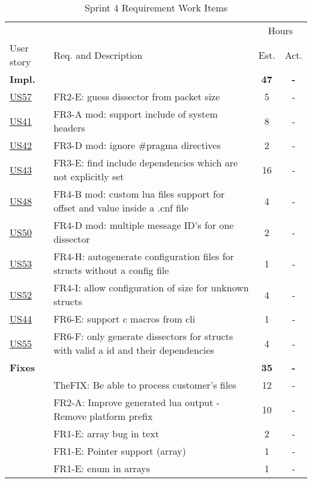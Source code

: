 \begin{table}[!htb] \small \center
\caption{Sprint 4 Requirement Work Items \label{tab:sprint4req}}
\begin{tabularx}{\textwidth}{l X c c}
	\toprule
	& & \multicolumn{2}{c}{Hours} \\
	\cmidrule(r){3-4}
	User story & Req. and Description & Est. & Act. \\
	\midrule
	\textbf{Impl.} &  & \textbf{47} & \textbf{-} \\
	\hyperref[tab:req:stories13]{US57} & FR2-E: guess \gls{dissector} from \gls{packet} size & 5 & - \\
 	\hyperref[tab:req:stories10]{US41} & FR3-A mod: support \gls{include} of system \glspl{header} &  8  & - \\
	\hyperref[tab:req:stories10]{US42} & FR3-D mod: ignore \#pragma directives & 2 & - \\
	\hyperref[tab:req:stories10]{US43} & FR3-E: find include dependencies which are not explicitly set & 16  & - \\
	\hyperref[tab:req:stories11]{US48} & FR4-B mod: custom \Gls{lua} files support for offset and value inside a .cnf file & 4 & - \\
	\hyperref[tab:req:stories12]{US50} & FR4-D mod: multiple message ID's for one \gls{dissector} & 2 & - \\
	\hyperref[tab:req:stories12]{US53} & FR4-H: autogenerate configuration files for \glspl{struct} without a config file & 1  & - \\
	\hyperref[tab:req:stories12]{US52} & FR4-I: allow configuration of size for unknown \glspl{struct} & 4 & - \\
	\hyperref[tab:req:stories10]{US44} & FR6-E: support \Gls{c} macros from \gls{cli} & 1 & - \\
	\hyperref[tab:req:stories12]{US55} & FR6-F: only generate \glspl{dissector} for \glspl{struct} with valid a id and their dependencies & 4 & - \\
	\addlinespace
	\textbf{Fixes} &  & \textbf{35} & \textbf{-} \\
	& TheFIX: Be able to process customer's files & 12 & - \\
	 & FR2-A: Improve generated \Gls{lua} output - Remove platform prefix & 10 & - \\
	 & FR1-E: \Gls{array} bug in text & 2 & - \\
	 & FR1-E: Pointer support (array) & 1 & - \\
	 & FR1-E: \Gls{enum} in \glspl{array} & 1 & - \\		

\end{tabularx}
\end{table}
